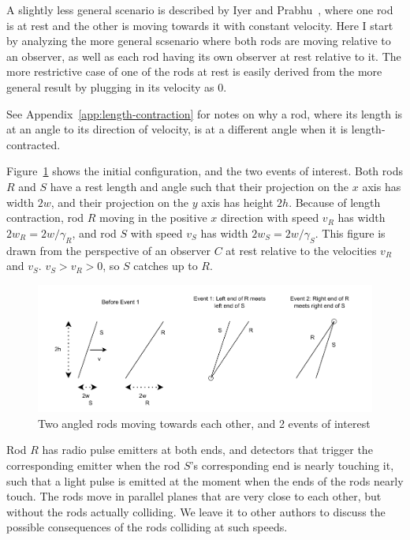 \documentclass[a4paper]{article}
\theoremstyle{plain}
\theoremstyle{definition}
\begin{document}
A slightly less general scenario is described by Iyer and
Prabhu~\cite{IP2006}, where one rod is at rest and the other is moving
towards it with constant velocity.  Here I start by analyzing the more
general scsenario where both rods are moving relative to an observer,
as well as each rod having its own observer at rest relative to it.
The more restrictive case of one of the rods at rest is easily derived
from the more general result by plugging in its velocity as 0.

See Appendix~\ref{app:length-contraction} for notes on why a rod,
where its length is at an angle to its direction of velocity, is at a
different angle when it is length-contracted.

Figure~\ref{fig:scenario-3b} shows the initial
configuration, and the two events of interest.  Both rods $R$ and $S$
have a rest length and angle such that their projection on the $x$
axis has width $2w$, and their projection on the $y$ axis has height
$2h$.  Because of length contraction, rod $R$ moving in the positive
$x$ direction with speed $v_R$ has width $2w_R = 2w/\gamma_R$, and rod
$S$ with speed $v_S$ has width $2w_S = 2w/\gamma_S$.  This figure is
drawn from the perspective of an observer $C$ at rest relative to the
velocities $v_R$ and $v_S$.  $v_S > v_R > 0$, so $S$ catches up to
$R$.
\begin{figure}[h!]
	\centering
	\includegraphics[width=1.0\textwidth]{scenario3b-events-cropped.pdf}
	\caption{Two angled rods moving towards each other, and 2 events of interest}
	\label{fig:scenario-3b}
\end{figure}

Rod $R$ has radio pulse emitters at both ends, and detectors that
trigger the corresponding emitter when the rod $S$'s corresponding end
is nearly touching it, such that a light pulse is emitted at the
moment when the ends of the rods nearly touch.  The rods move in
parallel planes that are very close to each other, but without the
rods actually colliding.  We leave it to other authors to discuss the
possible consequences of the rods colliding at such speeds.
\end{document}
